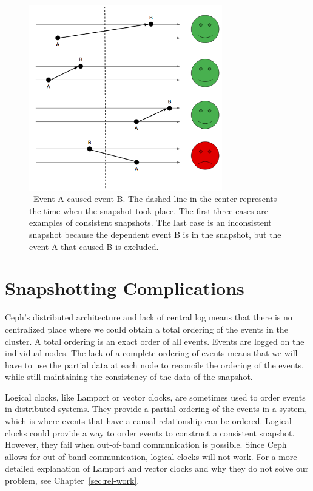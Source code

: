 \begin{figure}[!htbp]
  \centering
  \caption{~Event A caused event B. The dashed line in the center represents the time when the snapshot took place. The first three cases are examples of consistent snapshots. The last case is an inconsistent snapshot because the dependent event B is in the snapshot, but the event A that caused B is excluded.} 
  \label{fig:consistency}
  \includegraphics[width=0.75\textwidth]{consistency.png}
\end{figure}

\section{Snapshotting Complications}

Ceph's distributed architecture and lack of central log means that
there is no centralized place where we could obtain a total ordering
of the events in the cluster. A total ordering is an exact order of
all events. Events are logged on the individual nodes. The lack of a complete 
ordering of events means that we will have to use the partial data at each 
node to reconcile the ordering of the events, while still maintaining the 
consistency of the data of the snapshot.

Logical clocks, like Lamport or vector clocks, are sometimes used to
order events in distributed systems. They provide a partial ordering
of the events in a system, which is where events that have a causal
relationship can be ordered. Logical clocks could provide
a way to order events to construct a consistent snapshot. However,
they fail when out-of-band communication is possible. Since Ceph
allows for out-of-band communication, logical clocks will
not work. For a more detailed explanation of Lamport and vector clocks
and why they do not solve our problem, see Chapter~\ref{sec:rel-work}.

